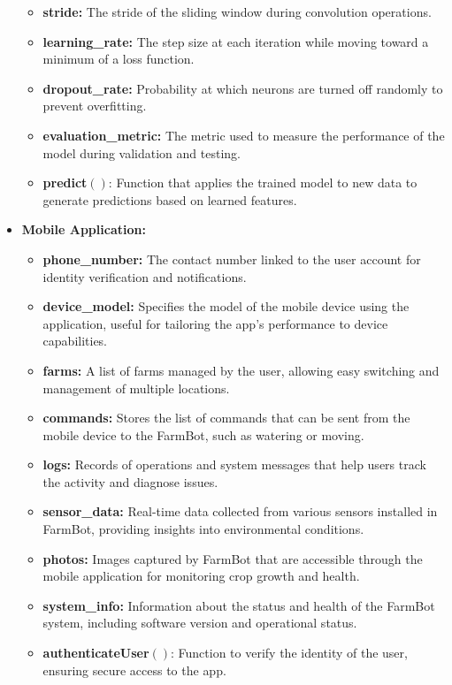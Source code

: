 \begin{itemize}
\begin{itemize}
            \item \textbf{stride:} The stride of the sliding window during convolution operations.
            \item \textbf{learning\_rate:} The step size at each iteration while moving toward a minimum of a loss function.
            \item \textbf{dropout\_rate:} Probability at which neurons are turned off randomly to prevent overfitting.
            \item \textbf{evaluation\_metric:} The metric used to measure the performance of the model during validation and testing.
            \item \textbf{predict}$()$: Function that applies the trained model to new data to generate predictions based on learned features.
        \end{itemize}
    \item \textbf{Mobile Application:}
        \begin{itemize}
            \item \textbf{phone\_number:} The contact number linked to the user account for identity verification and notifications.
            \item \textbf{device\_model:} Specifies the model of the mobile device using the application, useful for tailoring the app's performance to device capabilities.
            \item \textbf{farms:} A list of farms managed by the user, allowing easy switching and management of multiple locations.
            \item \textbf{commands:} Stores the list of commands that can be sent from the mobile device to the FarmBot, such as watering or moving.
            \item \textbf{logs:} Records of operations and system messages that help users track the activity and diagnose issues.
            \item \textbf{sensor\_data:} Real-time data collected from various sensors installed in FarmBot, providing insights into environmental conditions.
            \item \textbf{photos:} Images captured by FarmBot that are accessible through the mobile application for monitoring crop growth and health.
            \item \textbf{system\_info:} Information about the status and health of the FarmBot system, including software version and operational status.
            \item \textbf{authenticateUser}$()$: Function to verify the identity of the user, ensuring secure access to the app.

\end{itemize}
\end{itemize}
